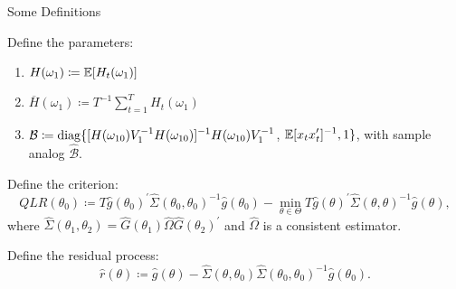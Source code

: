 \documentclass[smaller, aspectratio=169]{beamer}
\begin{document}
\begin{frame}[c]{Some Definitions}

    Define the parameters:
    \medskip
%
    \begin{enumerate}
        \item $\displaystyle H(\omega_{1}) \coloneqq \mathbb{E}[H_{t}(\omega_{1})]$ 
%
        \item $\displaystyle \overline{H}(\omega_{1}) \coloneqq T^{-1}\sum_{t=1}^{T} H_{t}(\omega_{1})$
        \item $\displaystyle \mathcal{B} \coloneqq \operatorname{diag}\lbrace[H(\omega_{10})V_{1}^{-1}H(\omega_{10})]^{-1}H(\omega_{10})V_{1}^{-1}$, $\displaystyle \mathbb{E}[x_{t}x_{t}^{\prime}]^{-1}, 1 \rbrace$,  with sample analog  $\displaystyle \widehat{\mathcal{B}}$.
%
    \end{enumerate}
%
    \bigskip
%
    Define the criterion:
%
    \begin{equation*}
      QLR(\theta_{0}) \coloneqq T \widehat{g} (\theta_{0})^{\prime}\widehat{\Sigma} (\theta_{0}, \theta_{0})^{-1}\widehat{g}(\theta_{0})-\underset{\theta \in \Theta}{\min}T\widehat{g}(\theta)^{\prime}\widehat{\Sigma} (\theta, \theta)^{-1}\widehat{g}(\theta),  
    \end{equation*}
    \quad where $\widehat{\Sigma}\left(\theta_{1}, \theta_{2}\right) = \widehat{G}(\theta_{1})\widehat{\Omega}\widehat{G}(\theta_{2})^{\prime}$ and $\widehat{\Omega}$ is a consistent estimator.
 
    \bigskip
%    
    Define the residual process:
    \begin{equation*}
      \widehat{r}(\theta) \coloneqq \widehat{g}(\theta)-\widehat{\Sigma}(\theta, \theta_{0})\widehat{\Sigma}(\theta_{0}, \theta_{0})^{-1}\widehat{g} (\theta_{0}). 
    \end{equation*}

\end{frame}
\end{document}
